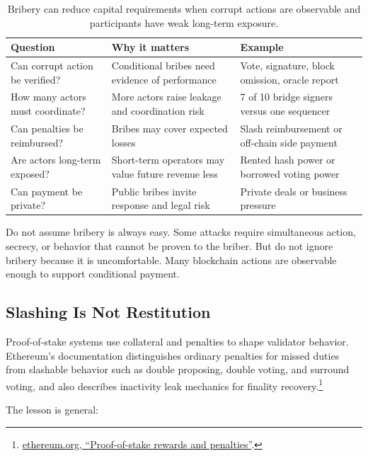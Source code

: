 \begin{table}[htbp]
\centering
\small
\renewcommand{\arraystretch}{1.16}
\begin{tabularx}{\textwidth}{@{}>{\RaggedRight\arraybackslash}p{}>{\RaggedRight\arraybackslash}p{}X@{}}
\toprule
Question & Why it matters & Example \\
\midrule
Can corrupt action be verified? & Conditional bribes need evidence of performance & Vote, signature, block omission, oracle report \\
How many actors must coordinate? & More actors raise leakage and coordination risk & 7 of 10 bridge signers versus one sequencer \\
Can penalties be reimbursed? & Bribes may cover expected losses & Slash reimbursement or off-chain side payment \\
Are actors long-term exposed? & Short-term operators may value future revenue less & Rented hash power or borrowed voting power \\
Can payment be private? & Public bribes invite response and legal risk & Private deals or business pressure \\
\bottomrule
\end{tabularx}
\caption{Bribery can reduce capital requirements when corrupt actions are observable and participants have weak long-term exposure.}
\end{table}

Do not assume bribery is always easy. Some attacks require simultaneous action, secrecy, or behavior that cannot be proven to the briber. But do not ignore bribery because it is uncomfortable. Many blockchain actions are observable enough to support conditional payment.

\subsection{Slashing Is Not Restitution}

Proof-of-stake systems use collateral and penalties to shape validator behavior. Ethereum's documentation distinguishes ordinary penalties for missed duties from slashable behavior such as double proposing, double voting, and surround voting, and also describes inactivity leak mechanics for finality recovery.\footnote{\href{https://ethereum.org/developers/docs/consensus-mechanisms/pos/rewards-and-penalties/}{ethereum.org, ``Proof-of-stake rewards and penalties''}.}

The lesson is general:

